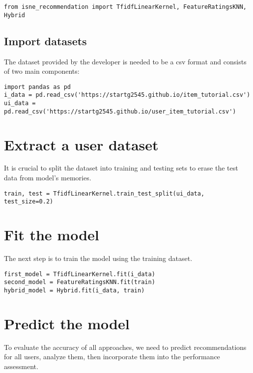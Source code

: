 \begin{verbatim}
from isne_recommendation import TfidfLinearKernel, FeatureRatingsKNN, Hybrid
\end{verbatim}

\subsection{Import datasets}

The dataset provided by the developer is needed to be a csv format and consists of two main components:

\begin{verbatim}
import pandas as pd
i_data = pd.read_csv('https://startg2545.github.io/item_tutorial.csv')
ui_data = pd.read_csv('https://startg2545.github.io/user_item_tutorial.csv')
\end{verbatim}

\section{Extract a user dataset}

It is crucial to split the dataset into training and testing sets to erase the 
test data from model's memories.

\begin{verbatim}
train, test = TfidfLinearKernel.train_test_split(ui_data, test_size=0.2)
\end{verbatim}

\section{Fit the model}

The next step is to train the model using the training dataset.

\begin{verbatim}
first_model = TfidfLinearKernel.fit(i_data)
second_model = FeatureRatingsKNN.fit(train)
hybrid_model = Hybrid.fit(i_data, train)
\end{verbatim}

\section{Predict the model}

To evaluate the accuracy of all approaches, we need to predict recommendations for all 
users, analyze them, then incorporate them into the performance assessment.

